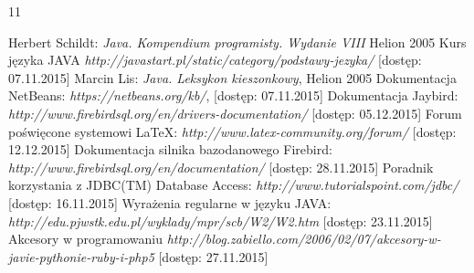 

\raggedright

\setcounter{secnumdepth}{-1}
\begin {thebibliography}{11} 

 Herbert Schildt: \emph{Java. Kompendium programisty. Wydanie VIII}  Helion 2005
\vspace{1.21em}
 Kurs języka JAVA  \emph{http://javastart.pl/static/category/podstawy-jezyka/} [dostęp: 07.11.2015]
\vspace{1.21em}
 Marcin Lis: \emph{Java. Leksykon kieszonkowy}, Helion 2005
\vspace{1.21em}
 Dokumentacja NetBeans: \emph{https://netbeans.org/kb/}, [dostęp: 07.11.2015]
\vspace{1.21em}
 Dokumentacja Jaybird: \emph{http://www.firebirdsql.org/en/drivers-documentation/} [dostęp: 05.12.2015]
\vspace{1.21em}
 Forum poświęcone systemowi LaTeX: \emph{http://www.latex-community.org/forum/} [dostęp: 12.12.2015]
\vspace{1.21em}
 Dokumentacja silnika bazodanowego Firebird: \emph{http://www.firebirdsql.org/en/documentation/} [dostęp: 28.11.2015]
\vspace{1.21em}
 Poradnik korzystania z JDBC(TM) Database Access: \emph{http://www.tutorialspoint.com/jdbc/} [dostęp: 16.11.2015]
\vspace{1.21em}
 Wyrażenia regularne w języku JAVA: \emph{http://edu.pjwstk.edu.pl/wyklady/mpr/scb/W2/W2.htm} [dostęp: 23.11.2015]
\vspace{1.21em}
  Akcesory w programowaniu \emph{http://blog.zabiello.com/2006/02/07/akcesory-w-javie-pythonie-ruby-i-php5} [dostęp: 27.11.2015]

\end {thebibliography}


